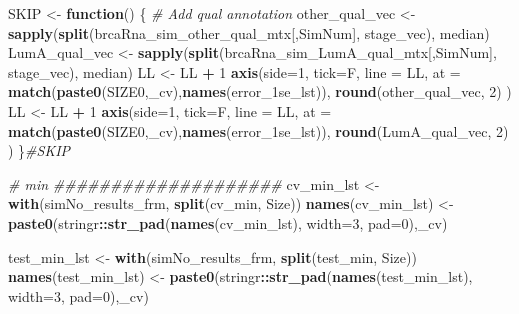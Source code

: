\documentclass[
]{book}
\newenvironment{Shaded}{\begin{snugshade}}{\end{snugshade}}
\newcommand{\CommentTok}[1]{\textcolor[rgb]{0.56,0.35,0.01}{\textit{#1}}}
\newcommand{\ControlFlowTok}[1]{\textcolor[rgb]{0.13,0.29,0.53}{\textbf{#1}}}
\newcommand{\DataTypeTok}[1]{\textcolor[rgb]{0.13,0.29,0.53}{#1}}
\newcommand{\DecValTok}[1]{\textcolor[rgb]{0.00,0.00,0.81}{#1}}
\newcommand{\KeywordTok}[1]{\textcolor[rgb]{0.13,0.29,0.53}{\textbf{#1}}}
\newcommand{\NormalTok}[1]{#1}
\newcommand{\OperatorTok}[1]{\textcolor[rgb]{0.81,0.36,0.00}{\textbf{#1}}}
\newcommand{\StringTok}[1]{\textcolor[rgb]{0.31,0.60,0.02}{#1}}
\begin{document}
\begin{Shaded}
\begin{Highlighting}[]
\NormalTok{SKIP  <{-}}\StringTok{ }\ControlFlowTok{function}\NormalTok{() \{}
\CommentTok{\# Add qual annotation}
\NormalTok{other\_qual\_vec <{-}}\StringTok{ }\KeywordTok{sapply}\NormalTok{(}\KeywordTok{split}\NormalTok{(brcaRna\_sim\_other\_qual\_mtx[,SimNum], stage\_vec), median)}
\NormalTok{LumA\_qual\_vec <{-}}\StringTok{ }\KeywordTok{sapply}\NormalTok{(}\KeywordTok{split}\NormalTok{(brcaRna\_sim\_LumA\_qual\_mtx[,SimNum], stage\_vec), median)}
\NormalTok{LL <{-}}\StringTok{ }\NormalTok{LL }\OperatorTok{+}\StringTok{ }\DecValTok{1}
\KeywordTok{axis}\NormalTok{(}\DataTypeTok{side=}\DecValTok{1}\NormalTok{, }\DataTypeTok{tick=}\NormalTok{F, }\DataTypeTok{line =}\NormalTok{ LL,}
  \DataTypeTok{at =} \KeywordTok{match}\NormalTok{(}\KeywordTok{paste0}\NormalTok{(SIZE0,}\StringTok{\textquotesingle{}\_cv\textquotesingle{}}\NormalTok{),}\KeywordTok{names}\NormalTok{(error\_1se\_lst)),}
  \KeywordTok{round}\NormalTok{(other\_qual\_vec, }\DecValTok{2}\NormalTok{)}
\NormalTok{ )}
\NormalTok{LL <{-}}\StringTok{ }\NormalTok{LL }\OperatorTok{+}\StringTok{ }\DecValTok{1}
\KeywordTok{axis}\NormalTok{(}\DataTypeTok{side=}\DecValTok{1}\NormalTok{, }\DataTypeTok{tick=}\NormalTok{F, }\DataTypeTok{line =}\NormalTok{ LL,}
  \DataTypeTok{at =} \KeywordTok{match}\NormalTok{(}\KeywordTok{paste0}\NormalTok{(SIZE0,}\StringTok{\textquotesingle{}\_cv\textquotesingle{}}\NormalTok{),}\KeywordTok{names}\NormalTok{(error\_1se\_lst)),}
  \KeywordTok{round}\NormalTok{(LumA\_qual\_vec, }\DecValTok{2}\NormalTok{)}
\NormalTok{ )}
\NormalTok{\}}\CommentTok{\#SKIP}

\CommentTok{\# min}
\CommentTok{\#\#\#\#\#\#\#\#\#\#\#\#\#\#\#\#\#\#\#\#}
\NormalTok{cv\_min\_lst <{-}}\StringTok{ }\KeywordTok{with}\NormalTok{(simNo\_results\_frm,}
 \KeywordTok{split}\NormalTok{(cv\_min, Size))}
\KeywordTok{names}\NormalTok{(cv\_min\_lst) <{-}}\StringTok{ }\KeywordTok{paste0}\NormalTok{(stringr}\OperatorTok{::}\KeywordTok{str\_pad}\NormalTok{(}\KeywordTok{names}\NormalTok{(cv\_min\_lst), }\DataTypeTok{width=}\DecValTok{3}\NormalTok{, }\DataTypeTok{pad=}\StringTok{\textquotesingle{}0\textquotesingle{}}\NormalTok{),}\StringTok{\textquotesingle{}\_cv\textquotesingle{}}\NormalTok{)}

\NormalTok{test\_min\_lst <{-}}\StringTok{ }\KeywordTok{with}\NormalTok{(simNo\_results\_frm,}
 \KeywordTok{split}\NormalTok{(test\_min, Size))}
\KeywordTok{names}\NormalTok{(test\_min\_lst) <{-}}\StringTok{ }\KeywordTok{paste0}\NormalTok{(stringr}\OperatorTok{::}\KeywordTok{str\_pad}\NormalTok{(}\KeywordTok{names}\NormalTok{(test\_min\_lst), }\DataTypeTok{width=}\DecValTok{3}\NormalTok{, }\DataTypeTok{pad=}\StringTok{\textquotesingle{}0\textquotesingle{}}\NormalTok{),}\StringTok{\textquotesingle{}\_cv\textquotesingle{}}\NormalTok{)}


\end{Highlighting}
\end{Shaded}
\end{document}
